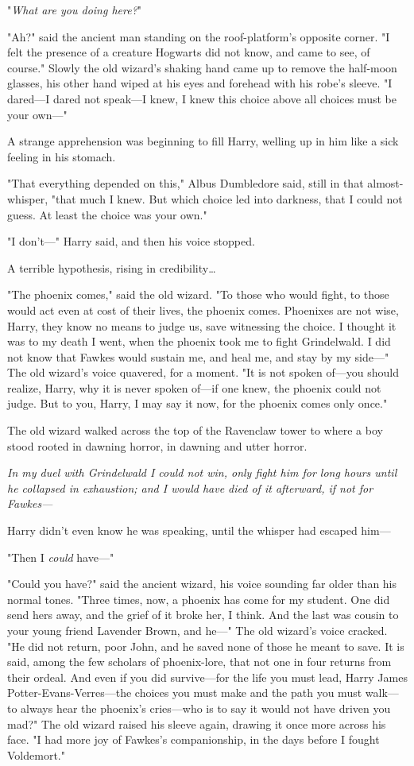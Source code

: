 "\emph{What are you doing here?}"

"Ah?" said the ancient man standing on the roof-platform's opposite corner. "I
felt the presence of a creature Hogwarts did not know, and came to see, of
course." Slowly the old wizard's shaking hand came up to remove the half-moon
glasses, his other hand wiped at his eyes and forehead with his robe's sleeve.
"I dared---I dared not speak---I knew, I knew this choice above all choices
must be your own---"

A strange apprehension was beginning to fill Harry, welling up in him like a
sick feeling in his stomach.

"That everything depended on this," Albus Dumbledore said, still in that
almost-whisper, "that much I knew. But which choice led into darkness, that I
could not guess. At least the choice was your own."

"I don't---" Harry said, and then his voice stopped.

A terrible hypothesis, rising in credibility{\ldots}

"The phoenix comes," said the old wizard. "To those who would fight, to those
would act even at cost of their lives, the phoenix comes. Phoenixes are not
wise, Harry, they know no means to judge us, save witnessing the choice. I
thought it was to my death I went, when the phoenix took me to fight
Grindelwald. I did not know that Fawkes would sustain me, and heal me, and stay
by my side---" The old wizard's voice quavered, for a moment. "It is not spoken
of---you should realize, Harry, why it is never spoken of---if one knew,
the phoenix could not judge. But to you, Harry, I may say it now, for the
phoenix comes only once."

The old wizard walked across the top of the Ravenclaw tower to where a boy
stood rooted in dawning horror, in dawning and utter horror.

\emph{In my duel with Grindelwald I could not win, only fight him for long
hours until he collapsed in exhaustion; and I would have died of it afterward,
if not for Fawkes---}

Harry didn't even know he was speaking, until the whisper had escaped him---

"Then I \emph{could} have---"

"Could you have?" said the ancient wizard, his voice sounding far older than
his normal tones. "Three times, now, a phoenix has come for my student. One did
send hers away, and the grief of it broke her, I think. And the last was cousin
to your young friend Lavender Brown, and he---" The old wizard's voice cracked.
"He did not return, poor John, and he saved none of those he meant to save.
It is said, among the few scholars of phoenix-lore, that not one in four
returns from their ordeal. And even if you did survive---for the life you must
lead, Harry James Potter-Evans-Verres---the choices you must make and the path
you must walk---to always hear the phoenix's cries---who is to say it would not
have driven you mad?" The old wizard raised his sleeve again, drawing it once
more across his face. "I had more joy of Fawkes's companionship, in the days
before I fought Voldemort."

